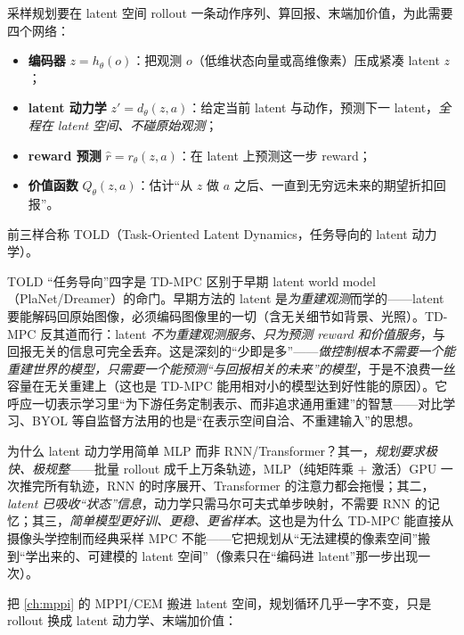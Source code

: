 \begin{definition}\label{def:mv-worldmodel}
采样规划要在 latent 空间 rollout 一条动作序列、算回报、末端加价值，为此需要四个网络\cite{hansen2022tdmpc}：
\begin{itemize}
  \item \textbf{编码器} $z=h_\theta(o)$：把观测 $o$（低维状态向量或高维像素）压成紧凑 latent $z$；
  \item \textbf{latent 动力学} $z'=d_\theta(z,a)$：给定当前 latent 与动作，预测下一 latent，\emph{全程在 latent 空间、不碰原始观测}；
  \item \textbf{reward 预测} $\hat r=r_\theta(z,a)$：在 latent 上预测这一步 reward；
  \item \textbf{价值函数} $Q_\theta(z,a)$：估计“从 $z$ 做 $a$ 之后、一直到无穷远未来的期望折扣回报”。
\end{itemize}
前三样合称 TOLD（Task-Oriented Latent Dynamics，任务导向的 latent 动力学）。
\end{definition}

\begin{insight}
TOLD “任务导向”四字是 TD-MPC 区别于早期 latent world model（PlaNet/Dreamer）的命门。早期方法的 latent 是\emph{为重建观测}而学的——latent 要能解码回原始图像，必须编码图像里的一切（含无关细节如背景、光照）。TD-MPC 反其道而行：latent \emph{不为重建观测服务、只为预测 reward 和价值服务}，与回报无关的信息可完全丢弃。这是深刻的“少即是多”——\emph{做控制根本不需要一个能重建世界的模型，只需要一个能预测“与回报相关的未来”的模型}，于是不浪费一丝容量在无关重建上（这也是 TD-MPC 能用相对小的模型达到好性能的原因）。它呼应一切表示学习里“为下游任务定制表示、而非追求通用重建”的智慧——对比学习、BYOL 等自监督方法用的也是“在表示空间自洽、不重建输入”的思想。
\end{insight}

\noindent 为什么 latent 动力学用简单 MLP 而非 RNN/Transformer？其一，\emph{规划要求极快、极规整}——批量 rollout 成千上万条轨迹，MLP（纯矩阵乘 $+$ 激活）GPU 一次推完所有轨迹，RNN 的时序展开、Transformer 的注意力都会拖慢；其二，\emph{latent 已吸收“状态”信息}，动力学只需马尔可夫式单步映射，不需要 RNN 的记忆；其三，\emph{简单模型更好训、更稳、更省样本}。这也是为什么 TD-MPC 能直接从摄像头学控制而经典采样 MPC 不能——它把规划从“无法建模的像素空间”搬到“学出来的、可建模的 latent 空间”（像素只在“编码进 latent”那一步出现一次）。

\begin{algo}\label{alg:mv-tdmpc-plan}
把 \cref{ch:mppi} 的 MPPI/CEM 搬进 latent 空间，规划循环几乎一字不变，只是 rollout 换成 latent 动力学、末端加价值：
\end{algo}

